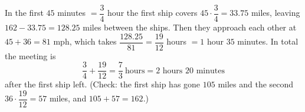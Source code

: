 In the first $45$ minutes $=\dfrac{3}{4}$ hour the first ship covers $45\cdot\dfrac{3}{4}=33.75$ miles, leaving $162-33.75=128.25$ miles between the ships. Then they approach each other at $45+36=81$ mph, which takes $\dfrac{128.25}{81}=\dfrac{19}{12}$ hours $=1$ hour $35$ minutes. In total the meeting is
\[
\dfrac{3}{4}+\dfrac{19}{12}=\dfrac{7}{3}\ \text{hours}=\boxed{2\text{ hours }20\text{ minutes}}
\]
after the first ship left. (Check: the first ship has gone $105$ miles and the second $36\cdot\dfrac{19}{12}=57$ miles, and $105+57=162$.)
